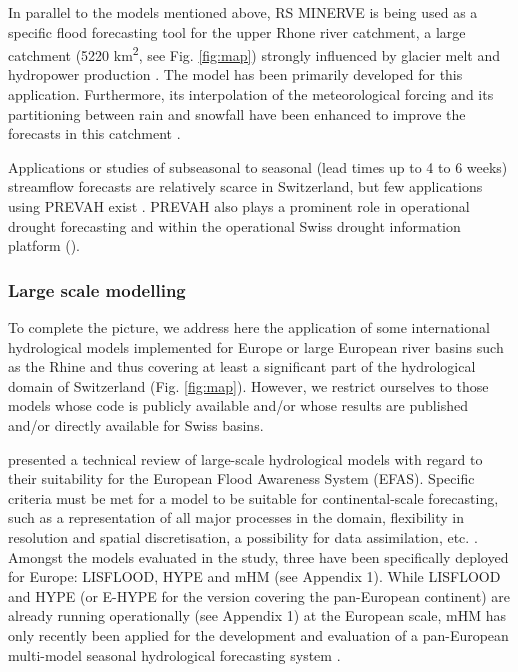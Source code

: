 \documentclass[10pt,a4paper]{article}
\begin{document}
In parallel to the models mentioned above, RS MINERVE is being used as a specific flood forecasting tool for the upper Rhone river catchment, a large catchment (5220 km\textsuperscript{2}, see Fig. \ref{fig:map}) strongly influenced by glacier melt and hydropower production \citep{GarciaHernandez2009b, GarciaHernandez2009, Jordan2010}. The model has been primarily developed for this application. Furthermore, its interpolation of the meteorological forcing and its partitioning between rain and snowfall have been enhanced to improve the forecasts in this catchment \citep{Tobin2011, Tobin2012}.

Applications or studies of subseasonal to seasonal (lead times up to 4 to 6 weeks) streamflow forecasts are relatively scarce in Switzerland, but few applications using PREVAH exist \citep[][]{Monhart2019, Anghileri2019}. PREVAH also plays a prominent role in operational drought forecasting \citep{Fundel2013, JorgHess2015, Bogner2018b} and within the operational Swiss drought information platform (\citealp{Stahli2013}). 


\subsubsection{Large scale modelling}
\label{sec:context:largescale}

To complete the picture, we address here the application of some international hydrological models implemented for Europe or large European river basins such as the Rhine and thus covering at least a significant part of the hydrological domain of Switzerland (Fig. \ref{fig:map}). However, we restrict ourselves to those models whose code is publicly available and/or whose results are published and/or directly available for Swiss basins.

\citet{Kauffeldt2016} presented a technical review of large-scale hydrological models with regard to their suitability for the European Flood Awareness System (EFAS). Specific criteria must be met for a model to be suitable for continental-scale forecasting, such as a representation of all major processes in the domain, flexibility in resolution and spatial discretisation, a possibility for data assimilation, etc. \citep{Kauffeldt2016}. Amongst the models evaluated in the study, three have been specifically deployed for Europe: LISFLOOD, HYPE and mHM (see Appendix 1). While LISFLOOD and HYPE (or E-HYPE for the version covering the pan-European continent) are already running operationally (see Appendix 1) at the European scale, mHM has only recently been applied for the development and evaluation of a pan-European multi-model seasonal hydrological forecasting system \citep{Wanders2019}.
\end{document}
